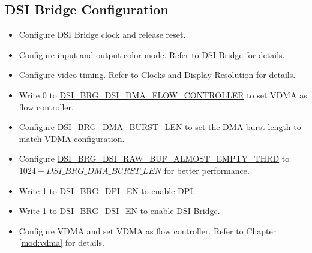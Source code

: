 \documentclass[main\_\_EN.tex]{subfiles}
\begin{document}
\subsection{DSI Bridge Configuration}
\label{sec:dsi-bridge-configuration}
\begin{itemize}
    \item Configure DSI Bridge clock and release reset.
    \item Configure input and output color mode. Refer to \hyperref[sec:dsi-bridge]{DSI Bridge} for details.
    \item Configure video timing. Refer to \hyperref[sec:clocks-and-display-resolution]{Clocks and Display Resolution} for details.
    \item Write 0 to \hyperref[fielddesc:DSIBRGDSIDMAFLOWCONTROLLER]{DSI\_BRG\_DSI\_DMA\_FLOW\_CONTROLLER} to set VDMA as flow controller.
    \item Configure \hyperref[fielddesc:DSIBRGDMABURSTLEN]{DSI\_BRG\_DMA\_BURST\_LEN} to set the DMA burst length to match VDMA configuration.
    \item Configure \hyperref[fielddesc:DSIBRGDSIRAWBUFALMOSTEMPTYTHRD]{DSI\_BRG\_DSI\_RAW\_BUF\_ALMOST\_EMPTY\_THRD} to $1024 - \hyperref[fielddesc:DSIBRGDMABURSTLEN]{DSI\_BRG\_DMA\_BURST\_LEN}$ for better performance.
    \item Write 1 to \hyperref[fielddesc:DSIBRGDPIEN]{DSI\_BRG\_DPI\_EN} to enable DPI.
    \item Write 1 to \hyperref[fielddesc:DSIBRGDSIEN]{DSI\_BRG\_DSI\_EN} to enable DSI Bridge.
    \item Configure VDMA and set VDMA as flow controller. Refer to Chapter \ref{mod:vdma} \textit{} for details.
\end{itemize}
\label{sec:mipidsi-dsi-bridge-programming-proc}
\end{document}
